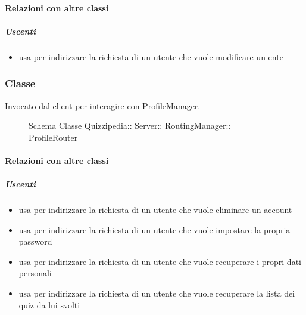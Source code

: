 \paragraph{Relazioni con altre classi}
\subparagraph{Uscenti}
\begin{itemize}
\item usa  per indirizzare la richiesta di un utente che vuole modificare un ente
\end{itemize}
\subsubsection{Classe }
Invocato dal client per interagire con ProfileManager.
\begin{figure}[H]
\centering
\noindent{}
\caption[Schema Classe ProfileRouter]{Schema Classe Quizzipedia:: Server:: RoutingManager:: ProfileRouter}
\end{figure}
\paragraph{Relazioni con altre classi}
\subparagraph{Uscenti}
\begin{itemize}
\item usa  per indirizzare la richiesta di un utente che vuole eliminare un account
\item usa  per indirizzare la richiesta di un utente che vuole impostare la propria password
\item usa  per indirizzare la richiesta di un utente che vuole recuperare i propri dati personali
\item usa  per indirizzare la richiesta di un utente che vuole recuperare la lista dei quiz da lui svolti
\end{itemize}
